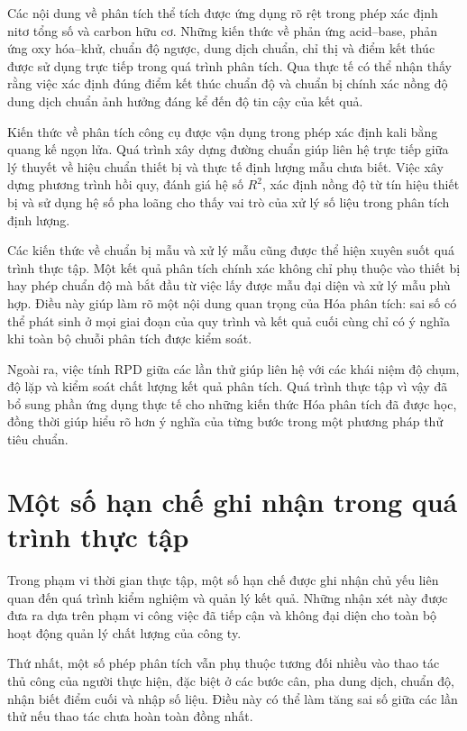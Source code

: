 Các nội dung về phân tích thể tích được ứng dụng rõ rệt trong phép xác định nitơ tổng số và carbon hữu cơ. Những kiến thức về phản ứng acid--base, phản ứng oxy hóa--khử, chuẩn độ ngược, dung dịch chuẩn, chỉ thị và điểm kết thúc được sử dụng trực tiếp trong quá trình phân tích. Qua thực tế có thể nhận thấy rằng việc xác định đúng điểm kết thúc chuẩn độ và chuẩn bị chính xác nồng độ dung dịch chuẩn ảnh hưởng đáng kể đến độ tin cậy của kết quả.

Kiến thức về phân tích công cụ được vận dụng trong phép xác định kali bằng quang kế ngọn lửa. Quá trình xây dựng đường chuẩn giúp liên hệ trực tiếp giữa lý thuyết về hiệu chuẩn thiết bị và thực tế định lượng mẫu chưa biết. Việc xây dựng phương trình hồi quy, đánh giá hệ số $R^2$, xác định nồng độ từ tín hiệu thiết bị và sử dụng hệ số pha loãng cho thấy vai trò của xử lý số liệu trong phân tích định lượng.

Các kiến thức về chuẩn bị mẫu và xử lý mẫu cũng được thể hiện xuyên suốt quá trình thực tập. Một kết quả phân tích chính xác không chỉ phụ thuộc vào thiết bị hay phép chuẩn độ mà bắt đầu từ việc lấy được mẫu đại diện và xử lý mẫu phù hợp. Điều này giúp làm rõ một nội dung quan trọng của Hóa phân tích: sai số có thể phát sinh ở mọi giai đoạn của quy trình và kết quả cuối cùng chỉ có ý nghĩa khi toàn bộ chuỗi phân tích được kiểm soát.

Ngoài ra, việc tính RPD giữa các lần thử giúp liên hệ với các khái niệm độ chụm, độ lặp và kiểm soát chất lượng kết quả phân tích. Quá trình thực tập vì vậy đã bổ sung phần ứng dụng thực tế cho những kiến thức Hóa phân tích đã được học, đồng thời giúp hiểu rõ hơn ý nghĩa của từng bước trong một phương pháp thử tiêu chuẩn.

\section{Một số hạn chế ghi nhận trong quá trình thực tập}

Trong phạm vi thời gian thực tập, một số hạn chế được ghi nhận chủ yếu liên quan đến quá trình kiểm nghiệm và quản lý kết quả. Những nhận xét này được đưa ra dựa trên phạm vi công việc đã tiếp cận và không đại diện cho toàn bộ hoạt động quản lý chất lượng của công ty.

Thứ nhất, một số phép phân tích vẫn phụ thuộc tương đối nhiều vào thao tác thủ công của người thực hiện, đặc biệt ở các bước cân, pha dung dịch, chuẩn độ, nhận biết điểm cuối và nhập số liệu. Điều này có thể làm tăng sai số giữa các lần thử nếu thao tác chưa hoàn toàn đồng nhất.


